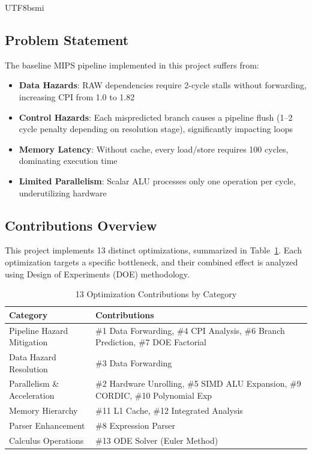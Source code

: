 \documentclass[journal,twoside]{IEEEtran}
\begin{document}
\begin{CJK}{UTF8}{bsmi}
\subsection{Problem Statement}
The baseline MIPS pipeline implemented in this project suffers from:
\begin{itemize}
    \item \textbf{Data Hazards}: RAW dependencies require 2-cycle stalls without forwarding, increasing CPI from 1.0 to 1.82
    \item \textbf{Control Hazards}: Each mispredicted branch causes a pipeline flush (1--2 cycle penalty depending on resolution stage), significantly impacting loops
    \item \textbf{Memory Latency}: Without cache, every load/store requires 100 cycles, dominating execution time
    \item \textbf{Limited Parallelism}: Scalar ALU processes only one operation per cycle, underutilizing hardware
\end{itemize}

\subsection{Contributions Overview}
This project implements 13 distinct optimizations, summarized in Table~\ref{tab:contributions}. Each optimization targets a specific bottleneck, and their combined effect is analyzed using Design of Experiments (DOE) methodology.

\begin{table}[!t]
\centering
\caption{13 Optimization Contributions by Category}
\label{tab:contributions}
\footnotesize
\begin{tabular}{@{}p{2.2cm}p{5.5cm}@{}}
\toprule
\textbf{Category} & \textbf{Contributions} \\
\midrule
Pipeline Hazard Mitigation & \#1 Data Forwarding, \#4 CPI Analysis, \#6 Branch Prediction, \#7 DOE Factorial \\
\midrule
Data Hazard Resolution & \#3 Data Forwarding \\
\midrule
Parallelism \& Acceleration & \#2 Hardware Unrolling, \#5 SIMD ALU Expansion, \#9 CORDIC, \#10 Polynomial Exp \\
\midrule
Memory Hierarchy & \#11 L1 Cache, \#12 Integrated Analysis \\
\midrule
Parser Enhancement & \#8 Expression Parser \\
\midrule
Calculus Operations & \#13 ODE Solver (Euler Method) \\
\bottomrule
\end{tabular}
\end{table}


\end{CJK}
\end{document}
